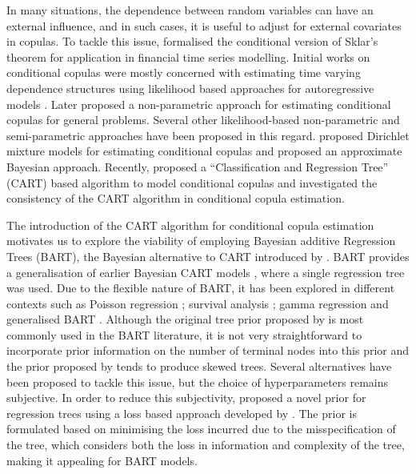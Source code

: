 \documentclass[
12pt]{article}
\begin{document}
	In many situations, the dependence between random variables can have an external influence, and in such cases, it is useful to adjust for external covariates in copulas. To tackle this issue, \citet{patton2006} formalised the conditional version of Sklar's theorem for application in financial time series modelling. Initial works on conditional copulas were mostly concerned with estimating time varying dependence structures using likelihood based approaches for autoregressive models \citep{patton2006,JONDEAU2006827,BARTRAM20071461}. Later \citet{acar2010} proposed a non-parametric approach for estimating conditional copulas for general problems. Several other likelihood-based non-parametric \citep{GIJBELS20111919} and semi-parametric \citep{ABEGAZ201243} approaches have been proposed in this regard. \citet{valle_cond_cop} proposed Dirichlet mixture models for estimating conditional copulas and \citet{GRAZIAN2022107417} proposed an approximate Bayesian approach. Recently, \citet{BonacinaLopezThomas+2025} proposed a ``Classification and Regression Tree'' (CART) based algorithm \citep{brei_CART} to model conditional copulas and investigated the consistency of the CART algorithm in conditional copula estimation.
	
	The introduction of the CART algorithm for conditional copula estimation motivates us to explore the viability of employing Bayesian additive Regression Trees (BART), the Bayesian alternative to CART introduced by \citet{chipman2010BART}. BART provides a generalisation of earlier Bayesian CART models \citep{chipman98BCART,denison98BCART}, where a single regression tree was used. Due to the flexible nature of BART, it has been explored in different contexts such as Poisson regression \citep{Murray03042021}; survival analysis \citep{Sparapani_BART}; gamma regression \citep{Linero_BART_gamma} and generalised BART \citep{Linero02012025}. Although the original tree prior proposed by \citet{chipman98BCART} is most commonly used in the BART literature, it is not very straightforward to incorporate prior information on the number of terminal nodes into this prior and the prior proposed by \citet{denison98BCART} tends to produce skewed trees. Several alternatives have been proposed \citep{Wu_CART,rockova_BART,Linero_BART_VS} to tackle this issue, but the choice of hyperparameters remains subjective. In order to reduce this subjectivity, \citet{serafini2024lossbasedpriortreetopologies} proposed a novel prior for regression trees using a loss based approach developed by \citet{villa_loss-prior}. The prior is formulated based on minimising the loss incurred due to the misspecification of the tree, which considers both the loss in information and complexity of the tree, making it appealing for BART models.
	
\end{document}
